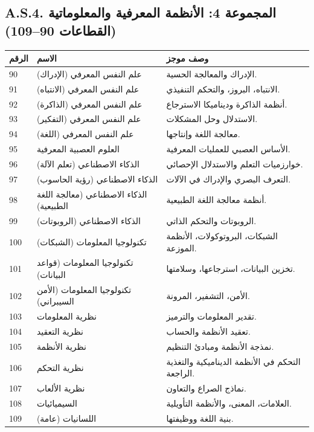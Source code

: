 \documentclass[13pt,a4paper]{article}
\begin{document}
	\subsection*{A.S.4. المجموعة 4: الأنظمة المعرفية والمعلوماتية (القطاعات 90--109)}
	
	\begin{longtable}{|p{0.9cm}|p{6.0cm}|p{8.6cm}|}
		\hline
		\textbf{الرقم} & \textbf{الاسم} & \textbf{وصف موجز} \\
		\hline
		\endhead
		90 & علم النفس المعرفي (الإدراك) & الإدراك والمعالجة الحسية. \\
		\hline
		91 & علم النفس المعرفي (الانتباه) & الانتباه، البروز، والتحكم التنفيذي. \\
		\hline
		92 & علم النفس المعرفي (الذاكرة) & أنظمة الذاكرة وديناميكا الاسترجاع. \\
		\hline
		93 & علم النفس المعرفي (التفكير) & الاستدلال وحل المشكلات. \\
		\hline
		94 & علم النفس المعرفي (اللغة) & معالجة اللغة وإنتاجها. \\
		\hline
		95 & العلوم العصبية المعرفية & الأساس العصبي للعمليات المعرفية. \\
		\hline
		96 & الذكاء الاصطناعي (تعلم الآلة) & خوارزميات التعلم والاستدلال الإحصائي. \\
		\hline
		97 & الذكاء الاصطناعي (رؤية الحاسوب) & التعرف البصري والإدراك في الآلات. \\
		\hline
		98 & الذكاء الاصطناعي (معالجة اللغة الطبيعية) & أنظمة معالجة اللغة الطبيعية. \\
		\hline
		99 & الذكاء الاصطناعي (الروبوتات) & الروبوتات والتحكم الذاتي. \\
		\hline
		100 & تكنولوجيا المعلومات (الشبكات) & الشبكات، البروتوكولات، الأنظمة الموزعة. \\
		\hline
		101 & تكنولوجيا المعلومات (قواعد البيانات) & تخزين البيانات، استرجاعها، وسلامتها. \\
		\hline
		102 & تكنولوجيا المعلومات (الأمن السيبراني) & الأمن، التشفير، المرونة. \\
		\hline
		103 & نظرية المعلومات & تقدير المعلومات والترميز. \\
		\hline
		104 & نظرية التعقيد & تعقيد الأنظمة والحساب. \\
		\hline
		105 & نظرية الأنظمة & نمذجة الأنظمة ومبادئ التنظيم. \\
		\hline
		106 & نظرية التحكم & التحكم في الأنظمة الديناميكية والتغذية الراجعة. \\
		\hline
		107 & نظرية الألعاب & نماذج الصراع والتعاون. \\
		\hline
		108 & السيميائيات & العلامات، المعنى، والأنظمة التأويلية. \\
		\hline
		109 & اللسانيات (عامة) & بنية اللغة ووظيفتها. \\
		\hline
	\end{longtable}
	
\end{document}
